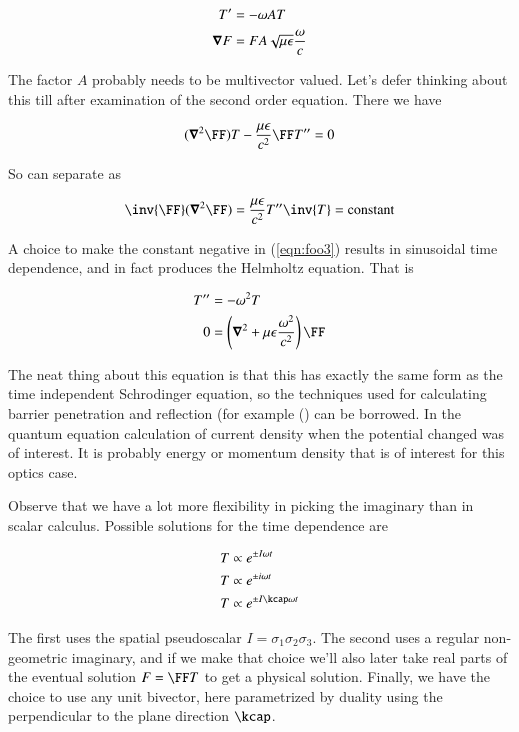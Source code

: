 \begin{align}\label{eqn:foo5}
T' &= -\omega A T \\
\boldsymbol{\nabla} F &= F A \sqrt{\mu\epsilon} \frac{\omega}{c}
\end{align}

The factor $A$ probably needs to be multivector valued.  Let's defer thinking about this till after examination of the second order equation.  There we have

\begin{align*}
(\spacegrad^2 \FF) T - \frac{\mu\epsilon}{c^2} \FF T'' = 0
\end{align*}

So can separate as 

\begin{align}\label{eqn:foo3}
\inv{\FF} (\spacegrad^2 \FF) = \frac{\mu\epsilon}{c^2} T'' \inv{T} = \text{constant}
\end{align}

A choice to make the constant negative in (\ref{eqn:foo3}) results in sinusoidal time dependence, and in fact produces the Helmholtz equation.  That is

\begin{align}\label{eqn:foo4}
T'' &= - \omega^2 T \\
  0 &= \left(\spacegrad^2 + \mu\epsilon \frac{\omega^2}{c^2} \right) \FF 
\end{align}

The neat thing about this equation is that this has exactly the same form as the time independent Schrodinger equation, so the techniques used for calculating barrier penetration and reflection (for example (\cite{bohm1989qt}) can be borrowed.  In the quantum equation calculation of current density when the potential changed was of interest.  It is probably energy or momentum density that is of interest for this optics case.

Observe that we have a lot more flexibility in picking the imaginary than in scalar calculus.  Possible solutions for the time dependence are

\begin{align*}
T &\propto e^{\pm I\omega t} \\
T &\propto e^{\pm i\omega t} \\
T &\propto e^{\pm I \kcap \omega t}
\end{align*}

The first uses the spatial pseudoscalar $I = \sigma_1 \sigma_2 \sigma_3$.  The second uses a regular non-geometric imaginary, and if we make that choice we'll also later take real parts of the eventual solution $F = \FF T$ to get a physical solution.  Finally, we have the choice to use any unit bivector, here parametrized by duality using the perpendicular to the plane direction $\kcap$.

\EndArticle
